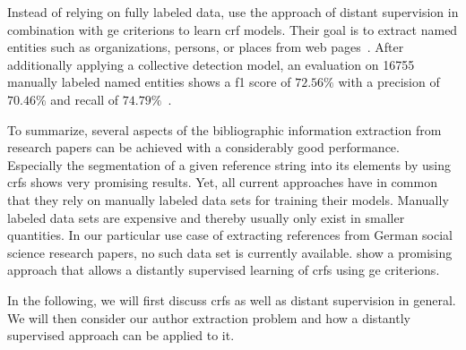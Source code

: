 \bigskip

Instead of relying on fully labeled data, \citet{lu2013web} use the approach of \gls{distant supervision} in combination with \glspl{ge criterion} to learn \gls{crf} models.
Their goal is to extract named entities such as organizations, persons, or places from web pages~\citep{lu2013web}.
After additionally applying a collective detection model, an evaluation on \num{16755} manually labeled named entities shows a \gls{f1 score} of $72.56\%$ with a \gls{precision} of $70.46\%$ and \gls{recall} of $74.79\%$~\citep{lu2013web}.

\bigskip

To summarize, several aspects of the bibliographic information extraction from research papers can be achieved with a considerably good performance.
Especially the segmentation of a given reference string into its elements by using \glspl{crf} \citep{peng2004accurate,councill2008parscit,groza2012reference} shows very promising results.
Yet, all current approaches have in common that they rely on manually labeled data sets for training their models.
Manually labeled data sets are expensive and thereby usually only exist in smaller quantities.
In our particular use case of extracting references from German social science research papers, no such data set is currently available.
\citet{lu2013web} show a promising approach that allows a distantly supervised learning of \glspl{crf} using \glspl{ge criterion}.

In the following, we will first discuss \glspl{crf} as well as \gls{distant supervision} in general.
We will then consider our author extraction problem and how a distantly supervised approach can be applied to it.

